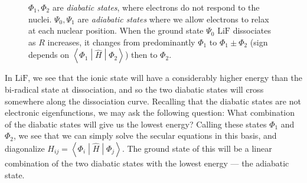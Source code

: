 \documentclass{article}
\theoremstyle{plain}\theoremheaderfont{\normalfont\itshape}\theorembodyfont{\rmfamily}\theoremseparator{.}\newtheorem*{rem}{Remark}\newtheorem*{ex}{Example}\newtheorem*{proof}{Proof}\newtheorem*{altp}{Alternative proof}
\theoremstyle{plain}\theoremheaderfont{\normalfont\bfseries}\theorembodyfont{\rmfamily}\theoremseparator{.}\newtheorem{thm}{Theorem}[section]\newtheorem{lem}[thm]{Lemma}\newtheorem{prop}[thm]{Proposition}\newtheorem*{cor}{Corollary}\newtheorem{defn}[thm]{Definition}\newtheorem{clm}[thm]{Claim}\newtheorem{clminproof}{Claim}\newtheorem{pos}{Postulate}[section]
\theoremstyle{break}\theoremheaderfont{\normalfont\itshape}\theorembodyfont{\rmfamily}\theoremseparator{.\medskip}\newtheorem*{proofskip}{Proof}\newtheorem*{exs}{Examples}\newtheorem*{rems}{Remarks}
\theoremstyle{break}\theoremheaderfont{\normalfont\bfseries}\theorembodyfont{\rmfamily}\theoremseparator{.\medskip}\newtheorem{lemskip}[thm]{Lemma}\newtheorem{defnskip}[thm]{Definition}\newtheorem{propskip}[thm]{Proposition}\newtheorem{thmskip}[thm]{Theorem}
\numberwithin{equation}{section}
\newcommand{\mel}[3]{\left\langle #1 \middle| #2 \middle| #3 \right\rangle}
\newcommand{\vdot}{\,\bm{\mathrm{\cdot}}\,}
\begin{document}
    \begin{figure}
        \centering
        \caption{\(\Phi_1,\Phi_2\) are \textit{diabatic states}, where electrons do not respond to the nuclei. \(\Psi_0,\Psi_1\) are \textit{adiabatic states} where we allow electrons to relax at each nuclear position. When the ground state \(\Psi_0\) \(\mathrm{LiF}\) dissociates as \(R\) increases, it changes from predominantly \(\Phi_1\) to \(\Phi_1\pm\Phi_2\) (sign depends on \(\mel{\Phi_1}{\hat{H}}{\Phi_2}\)) then to \(\Phi_2\).}
    \end{figure}

    In \(\mathrm{LiF}\), we see that the ionic state will have a considerably higher energy than the bi-radical state at dissociation, and so the two diabatic states will cross somewhere along the dissociation curve. Recalling that the diabatic states are not electronic eigenfunctions, we may ask the following question: What combination of the diabatic states will give us the lowest energy? Calling these states \(\Phi_1\) and \(\Phi_2\), we see that we can simply solve the secular equations in this basis, and diagonalize \(H_{ij}=\mel{\Phi_i}{\hat{H}}{\Phi_{j}}\). The ground state of this will be a linear combination of the two diabatic states with the lowest energy --- the adiabatic state.
\end{document}
